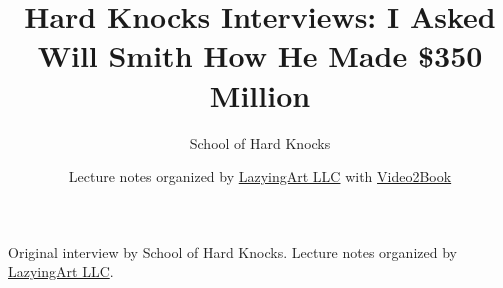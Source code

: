 \documentclass[11pt,oneside]{book}
\begin{document}
\frontmatter
\title{Hard Knocks Interviews: I Asked Will Smith How He Made \$350 Million}
\author{School of Hard Knocks}
\date{Lecture notes organized by \href{https://lazying.art}{LazyingArt LLC} with \href{https://github.com/lachlanchen/Video2Book}{Video2Book}}
\maketitle
\begin{center}
\small Original interview by School of Hard Knocks. Lecture notes organized by \href{https://lazying.art}{LazyingArt LLC}.
\end{center}
\clearpage
\mainmatter

\end{document}
